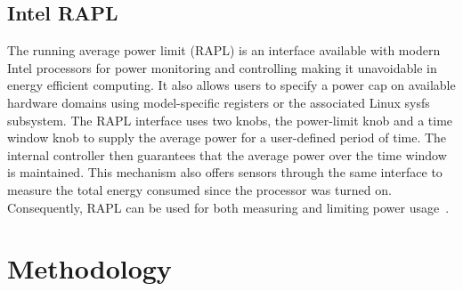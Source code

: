 \subsection{Intel RAPL} \label{subsec:RAPL} The running average power limit (RAPL) is an interface available with modern Intel processors for power monitoring and controlling making it unavoidable in energy efficient computing. It also allows users to specify a power cap on available hardware domains using model-specific registers or the associated Linux sysfs subsystem. 
The RAPL interface uses two knobs, the power-limit knob and a time window knob to supply the average power for a user-defined period of time. The internal controller then guarantees that the average power over the time window is maintained. This mechanism also offers sensors through the same interface to measure the total energy consumed since the processor was turned on. Consequently, RAPL can be used for both measuring and limiting power usage~\cite{rountree2012beyond}.



\section{Methodology}\label{ch3:sec:Methodology}

